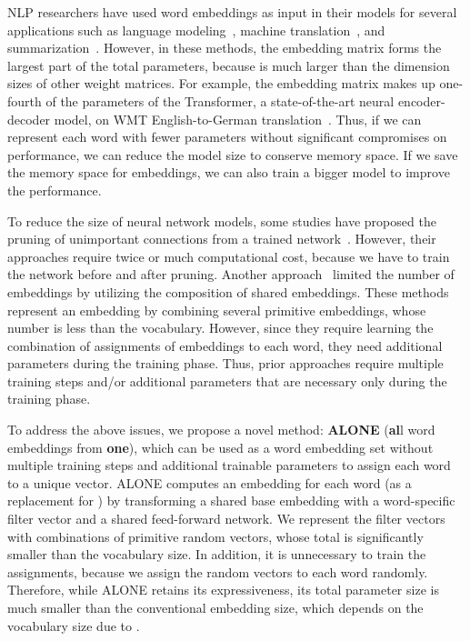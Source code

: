 \documentclass{article}
\begin{document}
NLP researchers have used word embeddings as input in their models for several applications such as language modeling~\cite{DBLP:journals/corr/ZarembaSV14}, machine translation~\cite{Sutskever:2014:SSL:2969033.2969173}, and summarization~\cite{rush-chopra-weston:2015:EMNLP}.
However, in these methods, the embedding matrix forms the largest part of the total parameters, because  is much larger than the dimension sizes of other weight matrices.
For example, the embedding matrix makes up one-fourth of the parameters of the Transformer, a state-of-the-art neural encoder-decoder model, on WMT English-to-German translation~\cite{NIPS2017_7181}.
Thus, if we can represent each word with fewer parameters without significant compromises on performance, we can reduce the model size to conserve memory space.
If we save the memory space for embeddings, we can also train a bigger model to improve the performance.


To reduce the size of neural network models, some studies have proposed the pruning of unimportant connections from a trained network~\cite{NIPS1989_250,NIPS2015_5784,zhang-etal-2017-towards}.
However, their approaches require twice or much computational cost, because we have to train the network before and after pruning.
Another approach~\cite{Suzuki:Compress:Embed,Shu:coding,pmlr-v80-chen18g} limited the number of embeddings by utilizing the composition of shared embeddings.
These methods represent an embedding by combining several primitive embeddings, whose number is less than the vocabulary.
However, since they require learning the combination of assignments of embeddings to each word, they need additional parameters during the training phase.
Thus, prior approaches require multiple training steps and/or additional parameters that are necessary only during the training phase.


To address the above issues, we propose a novel method: \textbf{ALONE} (\textbf{al}l word embeddings from \textbf{one}), which can be used as a word embedding set without multiple training steps and additional trainable parameters to assign each word to a unique vector.
ALONE computes an embedding for each word (as a replacement for ) by transforming a shared base embedding with a word-specific filter vector and a shared feed-forward network.
We represent the filter vectors with combinations of primitive random vectors, whose total is significantly smaller than the vocabulary size.
In addition, it is unnecessary to train the assignments, because we assign the random vectors to each word randomly.
Therefore, while ALONE retains its expressiveness, its total parameter size is much smaller than the conventional embedding size, which depends on the vocabulary size due to .
\end{document}
